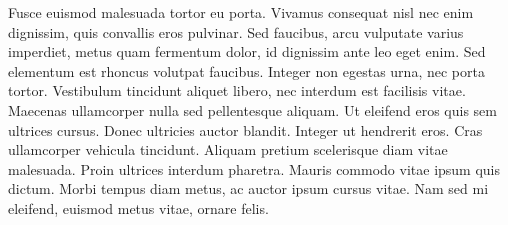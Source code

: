 \documentclass[../Paper.tex]{subfiles}
\begin{document}
Fusce euismod malesuada tortor eu porta. Vivamus consequat nisl nec enim dignissim,
quis convallis eros pulvinar. Sed faucibus, arcu vulputate varius imperdiet, metus
quam fermentum dolor, id dignissim ante leo eget enim. Sed elementum est rhoncus volutpat
faucibus. Integer non egestas urna, nec porta tortor. Vestibulum tincidunt aliquet
libero, nec interdum est facilisis vitae. Maecenas ullamcorper nulla sed pellentesque
aliquam. Ut eleifend eros quis sem ultrices cursus. Donec ultricies auctor blandit.
Integer ut hendrerit eros. Cras ullamcorper vehicula tincidunt. Aliquam pretium
scelerisque diam vitae malesuada. Proin ultrices interdum pharetra. Mauris commodo
vitae ipsum quis dictum. Morbi tempus diam metus, ac auctor ipsum cursus vitae.
Nam sed mi eleifend, euismod metus vitae, ornare felis.
\clearpage
\end{document}
